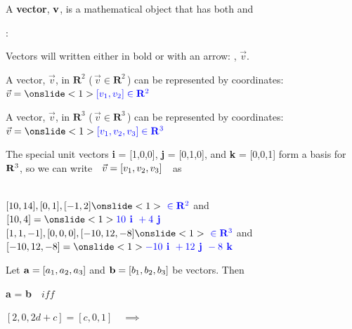 \begin{frame}
\frametitle{}

A {\bf vector}, ${\bf v}$, is a mathematical object that has both  and 

\vspace{0.5cm}

: \\

\vspace{0.2cm}

\OBUL  Vectors will written either in bold or with an arrow: , $\vec{v}$.\\

\vspace{0.2cm}

\OBUL  A vector, $\vec{v}$, in $\mathbf{R}^2$ (\,$\vec{v} \in \mathbf{R}^2$\,) can be represented by  coordinates: \quad $\vec{v} = \ON<1>{\B{\VV \in \mathbf{R}^2}}$\\

\vspace{0.2cm}

\OBUL  A vector, $\vec{v}$, in $\mathbf{R}^3$ (\,$\vec{v} \in \mathbf{R}^3$\,) can be represented by  coordinates: \quad $\vec{v} = \ON<1>{\B{\VVV \in \mathbf{R}^3}}$\\

\vspace{0.2cm}

\OBUL  The special unit vectors {\bf i} = [1,0,0], {\bf j} = [0,1,0], and {\bf k} = [0,0,1] form a basis for $\mathbf{R}^3$, \NEWLINE so we can write \,\, $\vec{v} = [v_1,v_2,v_3]$ \,\, as \,\, 

\vspace{0.5cm}

\EX \\
\vspace{0.1cm}
\OBUL $[10,14], [0,1], [-1,2] \ON<1>{\B{\,\, \in \mathbf{R}^2}}$ \quad and \quad $[10,4] = \ON<1>{\B{10\VI + 4 \VJ}}$\\
\vspace{0.2cm}
\OBUL $[1,1,-1], [0,0,0], [-10,12,-8] \ON<1>{\B{\,\, \in \mathbf{R}^3}}$ \quad and \quad $[-10,12,-8] = \ON<1>{\B{-10\VI + 12 \VJ - 8\VK}}$\\

\vspace{0.5cm}

\THM Let ${\bf a} = [a_1,a_2,a_3]$ and ${\bf b} = [b_1,b_2,b_3]$ be vectors. Then
\begin{center}
	{\bf a} = {\bf b} \,\, $iff$ \quad \ON<1>{\B{$a_1 = b_1$, $a_2 = b_2$, $a_3 = b_3$}}
\end{center}

\EX \quad $[2,0,2d+c] = [c,0,1] \quad \implies$ \quad {} \quad {}


\vspace{0.8cm}

\end{frame}

